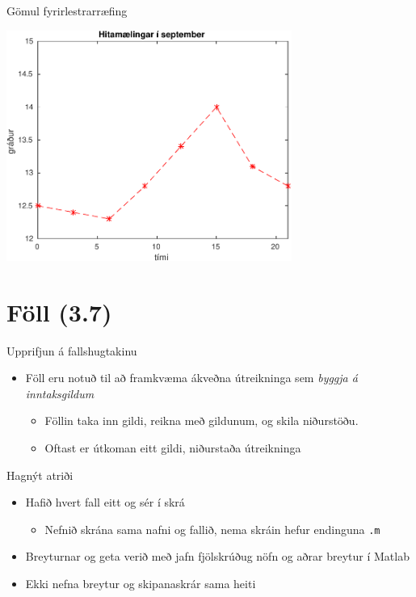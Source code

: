 \documentclass{beamer}
\begin{document}
\begin{frame}[fragile]{Gömul fyrirlestrarræfing}
\begin{center}
\includegraphics[width=0.7\textwidth]{Pics/septemberhiti}
\end{center}
\end{frame}

\section{Föll (3.7)}

\begin{frame}{Upprifjun á fallshugtakinu}
\begin{itemize}
 \item Föll eru notuð til að framkvæma ákveðna útreikninga sem \emph{byggja á inntaksgildum}
 \begin{itemize}
  \item Föllin taka inn gildi, reikna með gildunum, og skila niðurstöðu.
  \item Oftast er útkoman eitt gildi, niðurstaða útreikninga
 \end{itemize}
\end{itemize}
\end{frame}

\begin{frame}[fragile]{Hagnýt atriði}
\begin{itemize}
 \item Hafið hvert fall eitt og sér í skrá
 \begin{itemize}
  \item Nefnið skrána sama nafni og fallið, nema skráin hefur endinguna \texttt{.m}
 \end{itemize}
 \item Breyturnar og geta verið með jafn fjölskrúðug nöfn og aðrar breytur í Matlab
 \item Ekki nefna breytur og skipanaskrár sama heiti
\end{itemize}
\end{frame}
\end{document}

